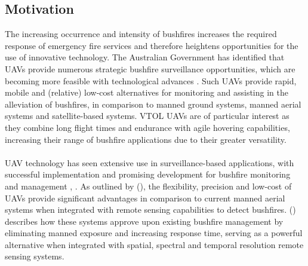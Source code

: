 \subsection{Motivation}
The increasing occurrence and intensity of bushfires increases the required response of emergency fire services and therefore heightens opportunities for the use of innovative technology. The Australian Government has identified that UAVs provide numerous strategic bushfire surveillance opportunities, which are becoming more feasible with technological advances \citep{RHYS5}. Such UAVs provide rapid, mobile and (relative) low-cost alternatives for monitoring and assisting in the alleviation of bushfires, in comparison to manned ground systems, manned aerial systems and satellite-based systems. VTOL UAVs are of particular interest as they combine long flight times and endurance with agile hovering capabilities, increasing their range of bushfire applications due to their greater versatility.\\
\\
UAV technology has seen extensive use in surveillance-based applications, with successful implementation and promising development for bushfire monitoring and management \citep{RN16}, \citep{RN21}. As outlined by \citeauthor{royo2011uas} (\citeyear{royo2011uas}), the flexibility, precision and low-cost of UAVs provide significant advantages in comparison to current manned aerial systems when integrated with remote sensing capabilities to detect bushfires. \citeauthor{RN17} (\citeyear{RN17}) describes how these systems approve upon existing bushfire management by eliminating manned exposure and increasing response time, serving as a powerful alternative when integrated with spatial, spectral and temporal resolution remote sensing systems.

